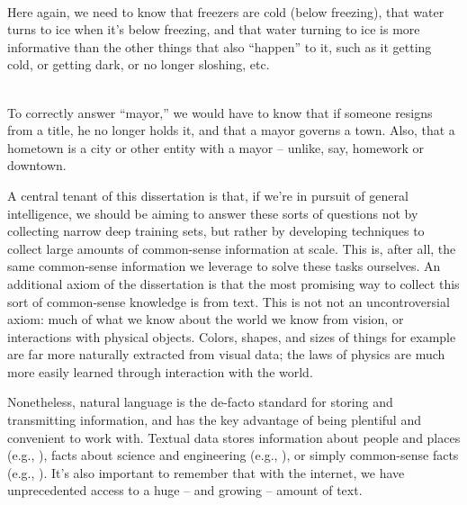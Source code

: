\begin{displayquote}
   \\
  Here again, we need to know that freezers are cold (below freezing), that water turns to ice
    when it's below freezing, and that water turning to ice is more informative than the other things
    that also ``happen'' to it, such as it getting cold, or getting dark, or no longer sloshing, etc.
\end{displayquote}

\begin{displayquote}
   \\
  To correctly answer ``mayor,'' we would have to know that if someone resigns from a title, he no longer
    holds it, and that a mayor governs a town.
  Also, that a hometown is a city or other entity with a mayor -- unlike, say, homework or downtown.
\end{displayquote}

%
%

A central tenant of this dissertation is that, if we're in pursuit of general intelligence, we should be
  aiming to answer these sorts of questions not by collecting narrow deep training sets, but rather
  by developing techniques to collect large amounts of common-sense information at scale.
This is, after all, the same common-sense information we leverage to solve these tasks ourselves.
An additional axiom of the dissertation is that the most promising way to collect this sort of 
  common-sense knowledge is from text.
This is not not an uncontroversial axiom: much of what we know about the world we know from
  vision, or interactions with physical objects.
Colors, shapes, and sizes of things for example are far more naturally extracted from visual data;
  the laws of physics are much more easily learned through interaction with the world.

Nonetheless, natural language is the de-facto standard for storing and transmitting 
  information, and has the key advantage of being plentiful and convenient to work with.
Textual data stores information about people and places (e.g., ), facts about science and engineering (e.g., ), 
  or simply common-sense facts (e.g., ). 
It's also important to remember that with the internet, we have unprecedented access to a 
  huge -- and growing -- amount of text.

